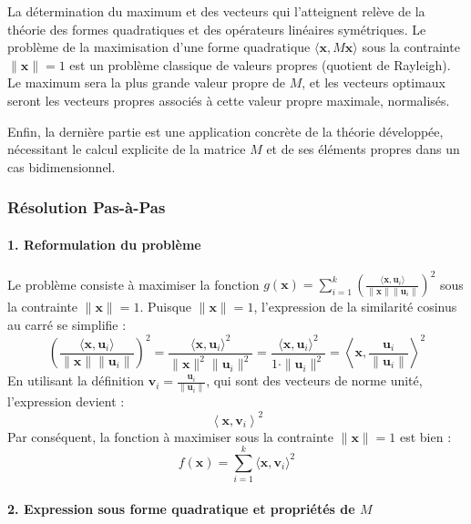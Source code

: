 \documentclass[11pt,a4paper]{report}
\begin{document}
La détermination du maximum et des vecteurs qui l'atteignent relève de
la théorie des formes quadratiques et des opérateurs linéaires
symétriques. Le problème de la maximisation d'une forme quadratique
\(\langle \mathbf{x}, M\mathbf{x} \rangle\) sous la contrainte
\(\|\mathbf{x}\|=1\) est un problème classique de valeurs propres
(quotient de Rayleigh). Le maximum sera la plus grande valeur propre de
\(M\), et les vecteurs optimaux seront les vecteurs propres associés à
cette valeur propre maximale, normalisés.

Enfin, la dernière partie est une application concrète de la théorie
développée, nécessitant le calcul explicite de la matrice \(M\) et de
ses éléments propres dans un cas bidimensionnel.

\hypertarget{ruxe9solution-pas-uxe0-pas}{%
\subsubsection{Résolution Pas-à-Pas}\label{ruxe9solution-pas-uxe0-pas}}

\hypertarget{reformulation-du-probluxe8me}{%
\paragraph{1. Reformulation du
problème}\label{reformulation-du-probluxe8me}}

Le problème consiste à maximiser la fonction
\(g(\mathbf{x}) = \sum_{i=1}^k \left( \frac{\langle \mathbf{x}, \mathbf{u}_i \rangle}{\|\mathbf{x}\| \|\mathbf{u}_i\|} \right)^2\)
sous la contrainte \(\|\mathbf{x}\|=1\). Puisque \(\|\mathbf{x}\|=1\),
l'expression de la similarité cosinus au carré se simplifie :
\[ \left( \frac{\langle \mathbf{x}, \mathbf{u}_i \rangle}{\|\mathbf{x}\| \|\mathbf{u}_i\|} \right)^2 = \frac{\langle \mathbf{x}, \mathbf{u}_i \rangle^2}{\|\mathbf{x}\|^2 \|\mathbf{u}_i\|^2} = \frac{\langle \mathbf{x}, \mathbf{u}_i \rangle^2}{1 \cdot \|\mathbf{u}_i\|^2} = \left\langle \mathbf{x}, \frac{\mathbf{u}_i}{\|\mathbf{u}_i\|} \right\rangle^2 \]
En utilisant la définition
\(\mathbf{v}_i = \frac{\mathbf{u}_i}{\|\mathbf{u}_i\|}\), qui sont des
vecteurs de norme unité, l'expression devient :
\[ \left\langle \mathbf{x}, \mathbf{v}_i \right\rangle^2 \] Par
conséquent, la fonction à maximiser sous la contrainte
\(\|\mathbf{x}\|=1\) est bien :
\[ f(\mathbf{x}) = \sum_{i=1}^k \langle \mathbf{x}, \mathbf{v}_i \rangle^2 \]

\hypertarget{expression-sous-forme-quadratique-et-propriuxe9tuxe9s-de-m}{%
\paragraph{\texorpdfstring{2. Expression sous forme quadratique et
propriétés de
\(M\)}{2. Expression sous forme quadratique et propriétés de M}}\label{expression-sous-forme-quadratique-et-propriuxe9tuxe9s-de-m}}
\end{document}
